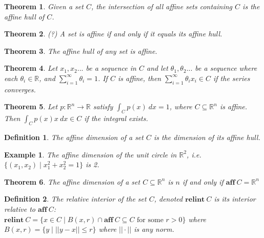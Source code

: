 \documentclass[a4paper]{article}
\newtheorem{mytheorem}{Theorem}
\newtheorem{example}{Example}
\newtheorem{mydef}{Definition}
\numberwithin{mytheorem}{section}
\numberwithin{mydef}{section}
\numberwithin{example}{section}
\begin{document}
\begin{mytheorem} Given a set $C$, the intersection of all affine sets containing $C$ is the affine hull of $C$. \end{mytheorem}

\begin{mytheorem} (?) A set is affine if and only if it equals its affine hull. \end{mytheorem}

\begin{mytheorem} The affine hull of any set is affine. \end{mytheorem}

\begin{mytheorem} Let $x_{1},x_{2}...$ be a sequence in $C$ and let $\theta_{1},\theta_{2}...$ be a sequence where each $\theta_{i} \in \mathbb{R}$, and $\sum_{i = 1}^{\infty} \theta_{i} = 1 $. If $C$ is affine, then $\sum_{i = 1}^{\infty} \theta_{i}x_{i} \in C $ if the series converges. \end{mytheorem}

\begin{mytheorem} Let $p : \mathbb{R}^{n} \rightarrow \mathbb{R} $ satisfy $\int_{C}p(x) \ dx = 1$, where $C \subseteq \mathbb{R}^{n}$ is affine. Then $\int_{C}p(x)x \ dx \in C $ if the integral exists. \end{mytheorem}

\begin{mydef} The affine dimension of a set $C$ is the dimension of its affine hull. \end{mydef}

\begin{example} The affine dimension of the unit circle in $\mathbb{R}^{2}$, i.e. $\{ (x_{1},x_{2}) \mid x^{2}_{1}+x^{2}_{2} = 1 \}$ is 2.  \end{example}

\begin{mytheorem} The affine dimension of a set $C \subseteq \mathbb{R}^{n}$ is $n$ if and only if $\textbf{aff} \ C = \mathbb{R}^{n} $ \end{mytheorem}

\begin{mydef} The relative interior of the set $C$, denoted $\textbf{relint} \ C$ is its interior relative to $\textbf{aff} \ C$: \\
$\textbf{relint} \ C = \{ x \in C \mid B(x,r) \cap \textbf{aff} \ C \subseteq C \text{ for some } r > 0  \}$ where $B(x,r) = \{ y \mid ||y - x|| \leq r \}$ where $||\cdot||$ is any norm. 
\end{mydef}
\end{document}
